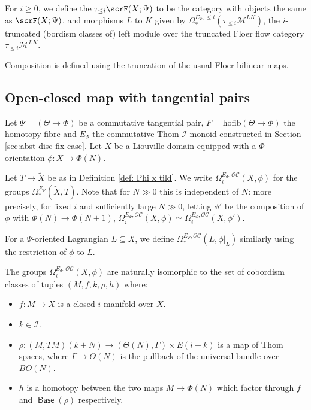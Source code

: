 \documentclass{TPmod}
\newcommand{\hofib}{\mathrm{hofib}}
\DeclareMathOperator{\Base}{\mathsf{Base}}
\newcommand{\cC}{\mathcal{C}}
\newcommand{\cI}{\mathcal{I}}
\newcommand{\cM}{\mathcal{M}}
\newcommand{\cO}{\mathcal{O}}
\renewcommand{\cong}{\simeq}
\numberwithin{equation}{section}
\begin{document}
    \begin{defn}\label{def: trunc fuk}
        For $i \geq 0$, we define the $\tau_{\leq i} \scrF(X; \Psi)$ to be the category with objects the same as $\scrF(X; \Psi)$, and morphisms $L$ to $K$ given by $\Omega^{E_\Psi, \leq i}_*(\tau_{\leq i}\cM^{LK})$, the $i$-truncated (bordism classes of) left module over the truncated Floer flow category $\tau_{\leq i}\cM^{LK}$.

        Composition is defined using the truncation of the usual Floer bilinear maps.
    \end{defn}
\subsection{Open-closed map with tangential pairs\label{sec:OC definitions}}
    

    Let $\Psi = (\Theta \to \Phi)$ be a commutative tangential pair, $F = \hofib(\Theta \to \Phi)$ the homotopy fibre and $E_\Psi$ the commutative Thom $\cI$-monoid constructed in Section \ref{sec:abst disc fix case}. Let $X$ be a Liouville domain equipped with a $\Phi$-orientation $\phi: X \to \Phi(N)$.

    Let $T \to \widetilde X$ be as in Definition \ref{def: Phi x tild}. We write $\Omega^{E_\Psi,\cO\cC}_i(X, \phi)$ for the groups $\Omega^{E_\Psi}_*(\widetilde X, T)$. Note that for $N \gg 0$ this is independent of $N$: more precisely, for fixed $i$ and sufficiently large $N \gg 0$, letting $\phi'$ be the composition of $\phi$ with $\Phi(N) \to \Phi(N+1)$, $\Omega^{E_\Psi,\cO\cC}_i(X, \phi) \cong \Omega^{E_\Psi,\cO\cC}_i(X, \phi')$. 
    
    For a $\Psi$-oriented Lagrangian $L \subseteq X$, we define $\Omega^{E_\Psi,\cO\cC}_*(L,\phi|_L)$ similarly using the restriction of $\phi$ to $L$.

    \begin{rmk}\label{rmk:explicit OC bordism class data}
        The groups $\Omega^{E_\Psi; \cO\cC}_i(X, \phi)$ are naturally isomorphic to the set of cobordism classes of tuples $(M, f, k, \rho, h)$ where:
        \begin{itemize}
            \item $f: M \to X$ is a closed $i$-manifold over $X$.
            \item $k \in \cI$.
            \item $\rho: (M, TM)(k+N) \to (\Theta(N), \Gamma) \times E(i+k)$ is a map of Thom spaces, where $\Gamma \to \Theta(N)$ is the pullback of the universal bundle over $BO(N)$.
            \item $h$ is a homotopy between the two maps $M \to \Phi(N)$ which factor through $f$ and $\Base(\rho)$ respectively.
        \end{itemize}
    \end{rmk}
\end{document}
